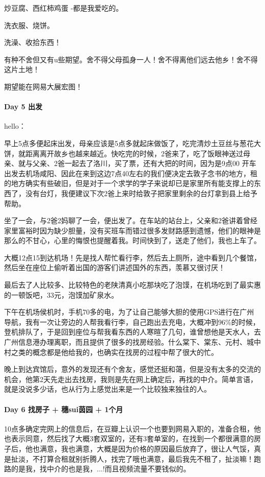 \documentclass[UTF8,a4paper,8pt]{ctexart}
\begin{document}
	 	炒豆腐、西红柿鸡蛋 -都是我爱吃的。
	 	 
	 	洗衣服、烧饼。
	 	
	 	洗澡、收拾东西！
	 	
	 	有种不舍但又有u些期望。舍不得父母孤身一人！舍不得离他们远去他乡！舍不得这片土地！
	 	
	 	期望能在网易大展宏图！
 	 \paragraph{Day 5    出发   \quad     }
	 	 hello：
	 	 
		 	早上5点多便起床出发，母亲应该是5点多就起床做饭了，吃完清炒土豆丝与葱花大饼，就距离离开故乡也越来越近。快吃完的时候，2爸来了，吃了饭眼神送过母亲、就与父亲、2爸一起去了洛川，买了票，还有大把的时间，因为是9点00 开车出发去机场咸阳、因此在来到这边7点40左右的我们便决定去敦子念书的地方，租的地方确实有些破旧，但是对于一个求学的学子来说却已是家里所有能支撑上的东西了，没有台灯，我便建议下次2爸上来时给敦子把家里剩余的台灯拿到县上给予帮助。
		 	
		 	坐了一会，与2爸2妈聊了一会，便出发了。在车站的站台上，父亲和2爸讲着曾经家里富裕时因为缺少胆量，没有买班车而错过很多发财路感到遗憾，他们的眼神是那么的不甘心，心里的悔恨也提醒着我。时间快到了，送走了他们，我也上车了。
		 	
		 	大概12点15到达机场！先是找人帮忙看行李，然后去上厕所，途中看到几个餐馆，然后坐在座位上偷听着出国的游客们讲述国外的东西，羡慕又很讨厌！
		 	
		 	最后去了人比较多、比较特色的老陕清真小吃那块吃了泡馍，在机场吃到了最实惠的一顿饭吧，33元，泡馍加矿泉水。
		 	
		 	下午在机场侯机时，手机70多的电，为了让自己能够大胆的使用GPS进行在广州导航，我有一次让旁边的人帮我看行李，自己跑出去充电，大概冲到96\%的时候，登机排队了，于是回到座位与帮我看东西的人寒暄了几句，谁曾想他是天水人，去广州信息港办理离职，而且提供了很多的找房经验。什么棠下、棠东、元村、城中村之类的概念都是他给我的，也确实在找房的过程中帮了很大的忙。
		 	
		 	晚上到达宾馆后，意外的发现还有个舍友，感觉还挺和蔼，但是没有太多的交流的机会，他第2天先走出去找房，我则是先在网上确定后，再找的中介。简单言语，就是没说多少话，也从行为上感觉出来是一个比较独来独往的人。
 	 
 	 \paragraph{Day 6    找房子 + 穗sui茵园 + 1个月 \quad     }
		 	 10点多确定完网上的信息后，在豆瓣上认识一个也要到网易入职的，准备合租，他也表示同意，然后找了大概3套双室的，还有3套单室的，在找到一个都很满意的房子后，他也满意，我也满意，大概是因为价格的原因最后放弃了，很让人气馁，真是扯淡，不打算合租就别折腾人，找完了哦也满意，最后我先不租了，扯淡嘛！跑路的是我，找中介的也是我，...!而且视频流量不要钱似的。
		 	 
\end{document}
